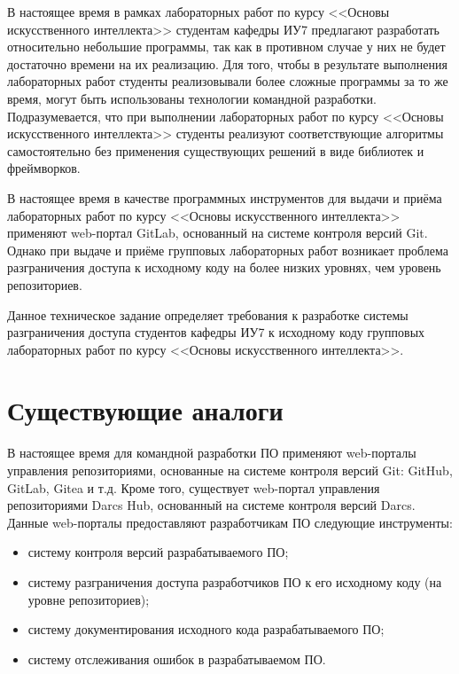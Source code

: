 \documentclass{bmstu}
\begin{document}
  В настоящее время в рамках лабораторных работ по курсу <<Основы
  искусственного интеллекта>> студентам кафедры ИУ7 предлагают
  разработать относительно небольшие программы, так как в противном
  случае у них не будет достаточно времени на их реализацию.
  Для того, чтобы в результате выполнения лабораторных работ студенты
  реализовывали более сложные программы за то же время, могут быть
  использованы технологии командной разработки.
  Подразумевается, что при выполнении лабораторных работ по курсу
  <<Основы искусственного интеллекта>> студенты реализуют соответствующие
  алгоритмы самостоятельно без применения существующих решений в
  виде библиотек и фреймворков.

  В настоящее время в качестве программных инструментов для выдачи и
  приёма лабораторных работ по курсу <<Основы искусственного
  интеллекта>> применяют web-портал GitLab, основанный на системе
  контроля версий Git.
  Однако при выдаче и приёме групповых лабораторных работ возникает
  проблема разграничения доступа к исходному коду на более низких
  уровнях, чем уровень репозиториев.

  Данное техническое задание определяет требования к разработке
  системы разграничения доступа студентов кафедры ИУ7 к исходному коду
  групповых лабораторных работ по курсу <<Основы искусственного
  интеллекта>>.

  \section{Существующие аналоги}

  В настоящее время для командной разработки ПО применяют web-порталы
  управления репозиториями, основанные на системе контроля версий Git:
  GitHub, GitLab, Gitea и т.д.
  Кроме того, существует web-портал управления репозиториями Darcs
  Hub, основанный на системе контроля версий Darcs.
  Данные web-порталы предоставляют разработчикам ПО следующие
  инструменты:
  \begin{itemize}[label=---]
    \item систему контроля версий разрабатываемого ПО;
    \item систему разграничения доступа разработчиков ПО к его
      исходному коду (на уровне репозиториев);
    \item систему документирования исходного кода разрабатываемого ПО;
    \item систему отслеживания ошибок в разрабатываемом ПО.
  \end{itemize}
\end{document}
